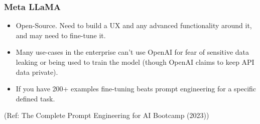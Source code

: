 













\begin{frame}[fragile]\frametitle{Meta LLaMA}

\begin{itemize}
\item  Open-Source. Need to build a UX and any advanced functionality around it, and may need to fine-tune it.
\item Many use-cases in the enterprise can’t use OpenAI for fear of sensitive data leaking or being used to train the model (though OpenAI claims to keep API data private).
\item If you have 200+ examples fine-tuning beats prompt engineering for a specific defined task.
\end{itemize}	 

{\tiny (Ref: The Complete Prompt Engineering for AI Bootcamp (2023))}

\end{frame}


